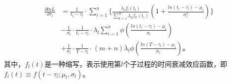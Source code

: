 \begin{eqnarray}
\label{eq:gradT}
\begin{split}
\frac{\partial lnL}{\partial \tau_l} &= \frac{1}{t_i-\tau_l} \cdot \sum_{i=1}^{n}\{ \frac{\lambda_l f_l(t_i)}{\sum_{k=1}^{K}\lambda_k f_k(t_i)}(1+\frac{ln(t_i-\tau_l)-\mu_l}{\sigma_l^2}) \} \\
& -\frac{1}{\sigma_l} \cdot \frac{1}{t_i-\tau_l}\cdot \lambda_l\sum_{i=1}^{n} \phi(\frac{ln(t_i-\tau_l)-\mu_l}{\sigma_l}) \\
& +\frac{1}{\sigma_l}\cdot \frac{1}{T-\tau_l}\cdot (m+n)\lambda_l\phi(\frac{ln(T-\tau_l)-\mu_l}{\sigma_l})\text{。}
\end{split}
\end{eqnarray}
其中，$f_l(t)$是一种缩写，表示使用第$l$个子过程的时间衰减效应函数，即$f_l(t) \equiv f(t-\tau_l;\mu_l,\sigma_l)$。